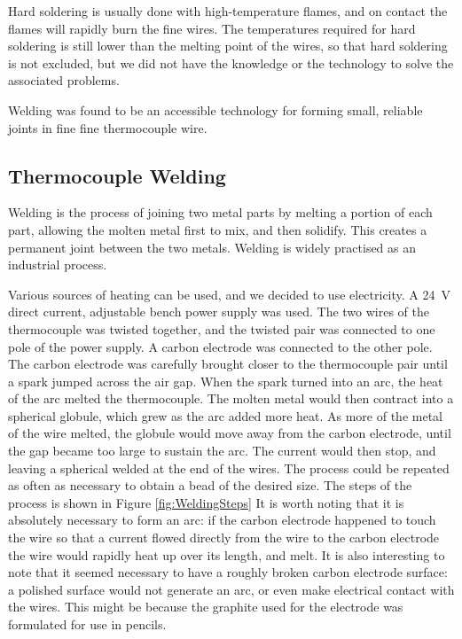 Hard soldering is usually done with high-temperature flames, and on contact the
flames will rapidly burn the fine wires. The temperatures required for hard
soldering is still lower than the melting point of the wires, so that hard
soldering is not excluded, but we did not have the knowledge or the technology
to solve the associated problems.

Welding was found to be an accessible technology for forming small, reliable
joints in fine fine thermocouple wire.

\subsection{Thermocouple Welding}

Welding is the process of joining two metal parts by melting a portion of each
part, allowing the molten metal first to mix, and then solidify. This creates a
permanent joint between the two metals. Welding is widely practised as an
industrial process.

Various sources of heating can be used, and we decided to use electricity. A
\SI{24}{\volt} direct current, adjustable bench power supply was used. The two
wires of the thermocouple was twisted together, and the twisted pair was
connected to one pole of the power supply. A carbon electrode was connected to
the other pole. The carbon electrode was carefully brought closer to the
thermocouple pair until a spark jumped across the air gap. When the spark turned
into an arc, the heat of the arc melted the thermocouple. The molten metal would
then contract into a spherical globule, which grew as the arc added more heat.
As more of the metal of the wire melted, the globule would move away from the
carbon electrode, until the gap became too large to sustain the arc. The current
would then stop, and leaving a spherical welded at the end of the wires. The
process could be repeated as often as necessary to obtain a bead of the desired
size. The steps of the process is shown in Figure \ref{fig:WeldingSteps} It is
worth noting that it is absolutely necessary to form an arc: if the carbon
electrode happened to touch the wire so that a current flowed directly from the
wire to the carbon electrode the wire would rapidly heat up over its length, and
melt. It is also interesting to note that it seemed necessary to have a roughly
broken carbon electrode surface: a polished surface would not generate an arc,
or even make electrical contact with the wires. This might be because the
graphite used for the electrode was formulated for use in pencils.

